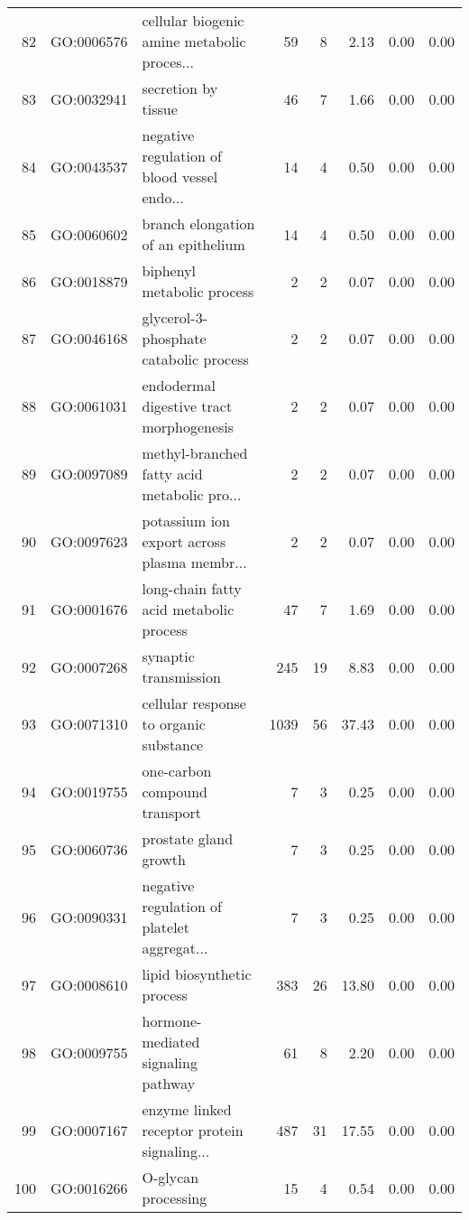\begin{table}[ht]
\begin{tabular}{rllrrrrr}
  82 & GO:0006576 & cellular biogenic amine metabolic proces... &  59 &   8 & 2.13 & 0.00 & 0.00 \\ 
  83 & GO:0032941 & secretion by tissue &  46 &   7 & 1.66 & 0.00 & 0.00 \\ 
  84 & GO:0043537 & negative regulation of blood vessel endo... &  14 &   4 & 0.50 & 0.00 & 0.00 \\ 
  85 & GO:0060602 & branch elongation of an epithelium &  14 &   4 & 0.50 & 0.00 & 0.00 \\ 
  86 & GO:0018879 & biphenyl metabolic process &   2 &   2 & 0.07 & 0.00 & 0.00 \\ 
  87 & GO:0046168 & glycerol-3-phosphate catabolic process &   2 &   2 & 0.07 & 0.00 & 0.00 \\ 
  88 & GO:0061031 & endodermal digestive tract morphogenesis &   2 &   2 & 0.07 & 0.00 & 0.00 \\ 
  89 & GO:0097089 & methyl-branched fatty acid metabolic pro... &   2 &   2 & 0.07 & 0.00 & 0.00 \\ 
  90 & GO:0097623 & potassium ion export across plasma membr... &   2 &   2 & 0.07 & 0.00 & 0.00 \\ 
  91 & GO:0001676 & long-chain fatty acid metabolic process &  47 &   7 & 1.69 & 0.00 & 0.00 \\ 
  92 & GO:0007268 & synaptic transmission & 245 &  19 & 8.83 & 0.00 & 0.00 \\ 
  93 & GO:0071310 & cellular response to organic substance & 1039 &  56 & 37.43 & 0.00 & 0.00 \\ 
  94 & GO:0019755 & one-carbon compound transport &   7 &   3 & 0.25 & 0.00 & 0.00 \\ 
  95 & GO:0060736 & prostate gland growth &   7 &   3 & 0.25 & 0.00 & 0.00 \\ 
  96 & GO:0090331 & negative regulation of platelet aggregat... &   7 &   3 & 0.25 & 0.00 & 0.00 \\ 
  97 & GO:0008610 & lipid biosynthetic process & 383 &  26 & 13.80 & 0.00 & 0.00 \\ 
  98 & GO:0009755 & hormone-mediated signaling pathway &  61 &   8 & 2.20 & 0.00 & 0.00 \\ 
  99 & GO:0007167 & enzyme linked receptor protein signaling... & 487 &  31 & 17.55 & 0.00 & 0.00 \\ 
  100 & GO:0016266 & O-glycan processing &  15 &   4 & 0.54 & 0.00 & 0.00 \\ 
   \hline
\end{tabular}
\end{table}

